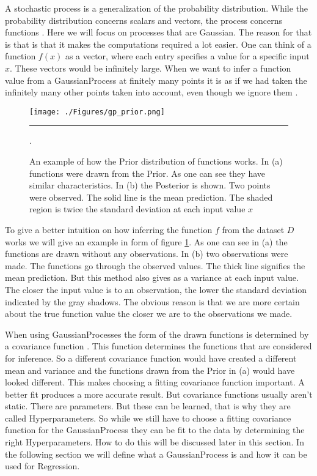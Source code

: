 A stochastic process is a generalization of the probability distribution. While the probability distribution concerns scalars and vectors, the process concerns functions \citep[p.\ 2]{Rasmussen:2005:GPM:1162254}. Here we will focus on processes that are Gaussian. The reason for that is that is that it makes the computations required a lot easier. 
One can think of a function $f(x)$ as a vector, where each entry specifies a value for a specific input $x$. These vectors would be infinitely large. When we want to infer a function value from a \Gls{GaussianProcess} at finitely many points it is as if we had taken the infinitely many other points taken into account, even though we ignore them \citep[p.\ 2]{Rasmussen:2005:GPM:1162254}. 
\begin{figure}[htbp]
	\centering
		\texttt{[image: ./Figures/gp\_prior.png]}
		\rule{35em}{0.5pt}
	\caption[\gls{Prior}]{An example of how the \gls{Prior} distribution of functions works. In (a) functions were drawn from the \gls{Prior}. As one can see they have similar characteristics. In (b) the \gls{Posterior} is shown. Two points were observed. The solid line is the mean prediction. The shaded region is twice the standard deviation at each input value $x$ \citep[p.\ 3]{Rasmussen:2005:GPM:1162254}}.
	\label{fig:gp_prior}
\end{figure}

To give a better intuition on how inferring the function $f$ from the dataset $D$ works we will give an example in form of figure \ref{fig:gp_prior}. As one can see in (a) the functions are drawn without any observations. In (b) two observations were made. The functions go through the observed values. The thick line signifies the mean prediction. But this method also gives as a variance at each input value. The closer the input value is to an observation, the lower the standard deviation indicated by the gray shadows. The obvious reason is that we are more certain about the true function value the closer we are to the observations we made.

When using \Gls{GaussianProcess}es the form of the drawn functions is determined by a covariance function \citep[p.\ 4]{Rasmussen:2005:GPM:1162254}. This function determines the functions that are considered for inference. So a different covariance function would have created a different mean and variance and the functions drawn from the \gls{Prior} in (a) would have looked different. This makes choosing a fitting covariance function important. A better fit produces a more accurate result. But covariance functions usually aren't static. There are parameters. But these can be learned, that is why they are called \gls{Hyperparameter}s. So while we still have to choose a fitting covariance function for the \Gls{GaussianProcess} they can be fit to the data by determining the right \gls{Hyperparameter}s. How to do this will be discussed later in this section. In the following section we will define what a \Gls{GaussianProcess} is and how it can be used for \gls{Regression}. 

